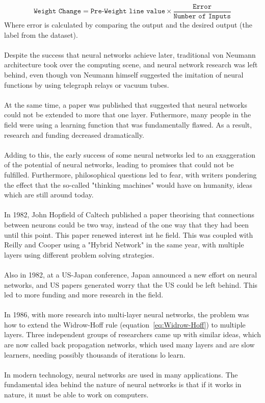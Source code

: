 \documentclass[titlepage]{article}
\begin{document}
\begin{equation} \label{eq:Widrow-Hoff}
    \texttt{Weight Change} = \texttt{Pre-Weight line value}\times \frac{\texttt{Error}}{\texttt{Number of Inputs}}
\end{equation}
Where error is calculated by comparing the output and the desired output (the label from the dataset).
\\\\
Despite the success that neural networks achieve later, traditional von Neumann architecture took over the computing scene, and neural network research was left behind, even though von Neumann himself suggested the imitation of neural functions by using telegraph relays or vacuum tubes.
\\\\
At the same time, a paper was published that suggested that neural networks could not be extended to more that one layer. Futhermore, many people in the field were using a learning function that was fundamentally flawed. As a result, research and funding decreased dramatically.
\\\\
Adding to this, the early success of some neural networks led to an exaggeration of the potential of neural networks, leading to promises that could not be fulfilled. Furthermore, philosophical questions led to fear, with writers pondering the effect that the so-called "thinking machines" would have on humanity, ideas which are still around today.
\\\\
In 1982, John Hopfield of Caltech published a paper theorising that connections between neurons could be two way, instead of the one way that they had been until this point. This paper renewed interest int he field. This was coupled with Reilly and Cooper using a "Hybrid Network" in the same year, with multiple layers using different problem solving strategies.
\\\\
Also in 1982, at a US-Japan conference, Japan announced a new effort on neural networks, and US papers generated worry that the US could be left behind. This led to more funding and more research in the field.
\\\\
In 1986, with more research into multi-layer neural networks, the problem was how to extend the Widrow-Hoff rule (equation~\ref{eq:Widrow-Hoff}) to multiple layers. Three independent groups of researchers came up with similar ideas, which are now called back propagation networks, which used many layers and are slow learners, needing possibly thousands of iterations lo learn.
\\\\
In modern technology, neural networks are used in many applications. The fundamental idea behind the nature of neural networks is that if it works in nature, it must be able to work on computers.
\newpage
\end{document}
